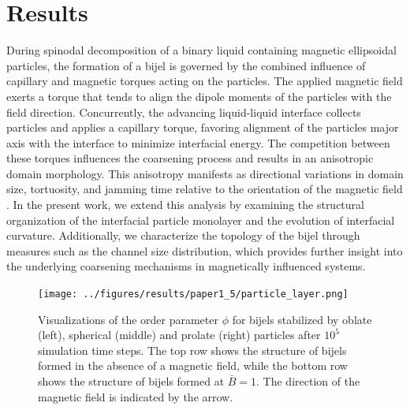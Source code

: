 \section{Results}

During spinodal decomposition of a binary liquid containing magnetic ellipsoidal particles, the formation of a bijel is governed by the combined influence of capillary and magnetic torques acting on 
the particles. The applied magnetic field exerts a torque that tends to align the dipole moments of the particles with the field direction. Concurrently, the advancing liquid-liquid interface collects 
particles and applies a capillary torque, favoring alignment of the particles major axis with the interface to minimize interfacial energy. The competition between these torques influences the 
coarsening process and results in an anisotropic domain morphology. This anisotropy manifests as directional variations in domain size, tortuosity, and jamming time relative to the orientation of 
the magnetic field \cite{karthikeyan_formation_2024}. In the present work, we extend this analysis by examining the structural organization of the interfacial particle monolayer and the evolution 
of interfacial curvature. Additionally, we characterize the topology of the bijel through measures such as the channel size distribution, which provides further insight into the underlying coarsening 
mechanisms in magnetically influenced systems.

\begin{figure}
\centering
\texttt{[image: ../figures/results/paper1\_5/particle\_layer.png]}%
\caption{Visualizations of the order parameter $\phi$ for bijels stabilized by oblate (left), spherical (middle) and prolate (right) particles 
         after $10^5$ simulation time steps. The top row shows the structure of bijels formed in the 
         absence of a magnetic field, while the bottom row shows the structure of bijels formed at $\bar{B} = 1$. 
         The direction of the magnetic field is indicated by the arrow.
\label{fig:particle_layer}}%
\end{figure}

